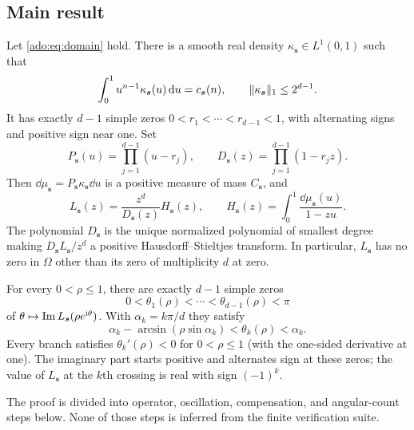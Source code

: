 \subsection{Main result}
\begin{theorem}
\label{ado:thm:main}
Let \eqref{ado:eq:domain} hold. There is a smooth real density
$\kappa_{\boldsymbol{s}}\in L^1(0,1)$ such that
\[
 \int_0^1u^{n-1}\kappa_{\boldsymbol{s}}(u)\,\mathrm d u=c_{\boldsymbol{s}}(n),\qquad
 \lVert\kappa_{\boldsymbol{s}}\rVert_1\le2^{d-1}.
\]
It has exactly $d-1$ simple zeros $0<r_1<\cdots<r_{d-1}<1$, with
alternating signs and positive sign near one. Set
\[
 P_{\boldsymbol{s}}(u)=\prod_{j=1}^{d-1}(u-r_j),\qquad
 D_{\boldsymbol{s}}(z)=\prod_{j=1}^{d-1}(1-r_jz).
\]
Then $\dd\mu_{\boldsymbol{s}}=P_{\boldsymbol{s}}\kappa_{\boldsymbol{s}}\dd u$ is a positive
measure of mass $C_{\boldsymbol{s}}$, and
\begin{equation}\label{ado:eq:mainfactor}
 L_{\boldsymbol{s}}(z)=\frac{z^d}{D_{\boldsymbol{s}}(z)}H_{\boldsymbol{s}}(z),\qquad
 H_{\boldsymbol{s}}(z)=\int_0^1\frac{\dd\mu_{\boldsymbol{s}}(u)}{1-zu}.
\end{equation}
The polynomial $D_{\boldsymbol{s}}$ is the unique normalized polynomial of
smallest degree making $D_{\boldsymbol{s}}L_{\boldsymbol{s}}/z^d$ a positive
Hausdorff--Stieltjes transform. In particular, $L_{\boldsymbol{s}}$ has no zero
in $\Omega$ other than its zero of multiplicity $d$ at zero.

For every $0<\rho\le1$, there are exactly $d-1$ simple zeros
\[
 0<\theta_1(\rho)<\cdots<\theta_{d-1}(\rho)<\pi
\]
of $\theta\mapsto\operatorname{Im} L_{\boldsymbol{s}}(\rho e^{\mathrm{i}\theta})$.
With $\alpha_k=k\pi/d$ they satisfy
\begin{equation}\label{ado:eq:mainangles}
 \alpha_k-\arcsin(\rho\sin\alpha_k)
 <\theta_k(\rho)<\alpha_k.
\end{equation}
Every branch satisfies $\theta_k'(\rho)<0$ for $0<\rho\le1$ (with the
one-sided derivative at one). The imaginary part starts positive and
alternates sign at these zeros;
the value of $L_{\boldsymbol{s}}$ at the $k$th crossing is real with sign $(-1)^k$.
\end{theorem}
The proof is divided into operator, oscillation, compensation, and
angular-count steps below. None of those steps is inferred from the
finite verification suite.


